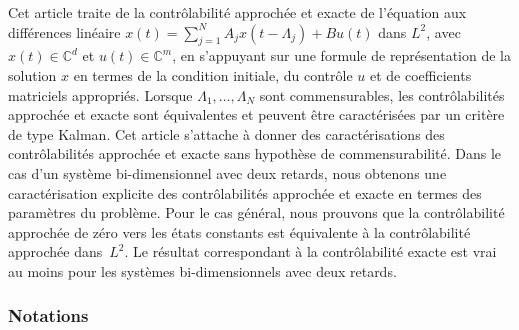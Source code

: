 \documentclass[JEP,XML,SOM,Unicode]{cedram}
\theoremstyle{plain}
\theoremstyle{definition}
\begin{document}




\begin{altabstract}
Cet article traite de la contrôlabilité approchée et exacte de l'équation aux différences linéaire $x(t)=\sum_{j=1}^NA_jx(t-\Lambda_j)+Bu(t)$ dans $L^2$, avec $x(t)\in\mathbb{C}^d$ et $u(t)\in\mathbb{C}^m$, en s'appuyant sur une formule de représentation de la solution $x$ en termes de la condition initiale, du contrôle $u$ et de coefficients matriciels appropriés. Lorsque $\Lambda_1,\dots,\Lambda_N$ sont commensurables, les contrôlabilités approchée et exacte sont équivalentes et peuvent être caractérisées par un critère de type Kalman. Cet article s'attache à donner des caractérisations des contrôlabilités approchée et exacte sans hypothèse de commensurabilité. Dans le cas d'un système bi-dimensionnel avec deux retards, nous obtenons une caractérisation explicite des contrôlabilités approchée et exacte en termes des paramètres du problème. Pour le cas général, nous prouvons que la contrôlabilité approchée de zéro vers les états constants est équivalente à la contrôlabilité approchée dans~$L^2$. Le résultat correspondant à la contrôlabilité exacte est vrai au moins pour les systèmes bi-dimen\-sionnels avec deux retards.
\end{altabstract}

\maketitle
\newpage
\tableofcontents
\mainmatter
\vspace*{-2\baselineskip}
\subsubsection*{Notations}
\end{document}
